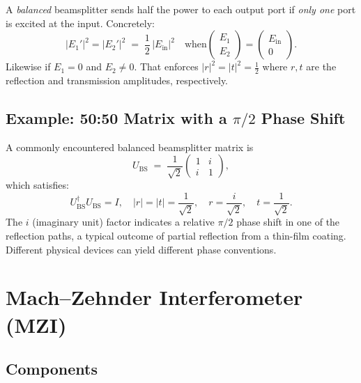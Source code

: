 \documentclass[12pt]{article}
\begin{document}
A \emph{balanced} beamsplitter sends half the power to each output port if \emph{only one} port is excited at the input.  Concretely:
\[
  \bigl|E_1'\bigr|^2 = \bigl|E_2'\bigr|^2 
  \;=\; \frac{1}{2} \, \bigl|E_{\text{in}}\bigr|^2
  \quad
  \text{when}
  \begin{pmatrix}
    E_1 \\ E_2
  \end{pmatrix}
  =
  \begin{pmatrix}
    E_{\text{in}} \\ 0
  \end{pmatrix}.
\]
Likewise if $E_1=0$ and $E_2\neq 0$.  That enforces $|r|^2 = |t|^2 = \tfrac12$ where $r,t$ are the reflection and transmission amplitudes, respectively.

\subsection{Example: 50:50 Matrix with a \texorpdfstring{$\pi/2$}{pi/2} Phase Shift}

A commonly encountered balanced beamsplitter matrix is
\begin{equation}
\label{eq:exBS}
  U_{\text{BS}}
  \;=\;
  \frac{1}{\sqrt{2}}
  \begin{pmatrix}
    1 & i \\
    i & 1
  \end{pmatrix},
\end{equation}
which satisfies:
\[
  U_{\text{BS}}^\dagger U_{\text{BS}} = I,
  \quad
  |r| = |t| = \frac{1}{\sqrt{2}},
  \quad
  r = \frac{i}{\sqrt{2}},
  \quad
  t = \frac{1}{\sqrt{2}}.
\]
The $i$ (imaginary unit) factor indicates a relative $\pi/2$ phase shift in one of the reflection paths, a typical outcome of partial reflection from a thin-film coating.  Different physical devices can yield different phase conventions.

\section{Mach--Zehnder Interferometer (MZI)}

\subsection{Components}
\end{document}
